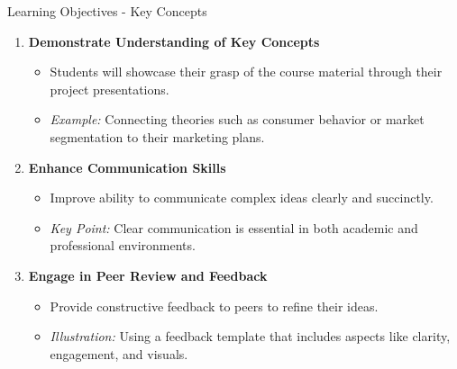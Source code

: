 \documentclass[aspectratio=169]{beamer}
\begin{document}
\begin{frame}[fragile]{Learning Objectives - Key Concepts}
  \begin{enumerate}
    \item \textbf{Demonstrate Understanding of Key Concepts}
      \begin{itemize}
        \item Students will showcase their grasp of the course material through their project presentations.
        \item \textit{Example:} Connecting theories such as consumer behavior or market segmentation to their marketing plans.
      \end{itemize}

    \item \textbf{Enhance Communication Skills}
      \begin{itemize}
        \item Improve ability to communicate complex ideas clearly and succinctly.
        \item \textit{Key Point:} Clear communication is essential in both academic and professional environments.
      \end{itemize}

    \item \textbf{Engage in Peer Review and Feedback}
      \begin{itemize}
        \item Provide constructive feedback to peers to refine their ideas.
        \item \textit{Illustration:} Using a feedback template that includes aspects like clarity, engagement, and visuals.
      \end{itemize}
  \end{enumerate}
\end{frame}
\end{document}

